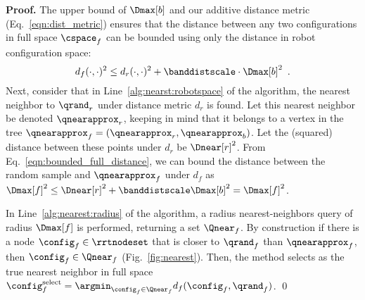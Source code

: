 \noindent
{\bf Proof.}
The upper bound of $\Dmax[b]$ and our additive distance metric (Eq.~\eqref{eqn:dist_metric}) ensures that the distance between any two configurations in full space $\cspace_f$ can be bounded using only the distance in robot configuration space:
\begin{equation}
    d_f(\cdot,\cdot)^2 \leq d_r(\cdot,\cdot)^2 + \banddistscale \cdot \Dmax[b]^2 \enspace .
    \label{eqn:bounded_full_distance}
\end{equation}
Next, consider that in Line~\ref{alg:nearst:robotspace} of the algorithm, the nearest neighbor to $\qrand_r$ under distance metric $d_r$ is found.  Let this nearest neighbor be denoted $\qnearapprox_r$, keeping in mind that it belongs to a vertex in the tree $\qnearapprox_f = (\qnearapprox_r, \qnearapprox_b)$.  Let the (squared) distance between these points under $d_r$ be $\Dnear[r]^2$.  From Eq.~\eqref{eqn:bounded_full_distance}, we can bound the distance between the random sample and $\qnearapprox_f$ under $d_f$ as $\Dmax[f]^2 \leq \Dnear[r]^2 + \banddistscale \Dmax[b]^2 = \Dmax[f]^2$.

In Line~\ref{alg:nearest:radius} of the algorithm, a radius nearest-neighbors query of radius $\Dmax[f]$ is performed, returning a set $\Qnear_f$.  By construction if there is a node $\config_f \in \rrtnodeset$ that is closer to $\qrand_f$ than $\qnearapprox_f$, then $\config_f \in \Qnear_f$ (Fig.~\ref{fig:nearest}). Then, the method selects as the true nearest neighbor in full space $\config^\textrm{select}_f = \argmin_{\config_f \in \Qnear_f}{d_f(\config_f, \qrand_f)}$.
\qed



